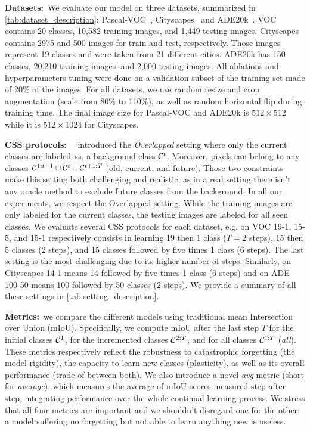 \noindent\textbf{Datasets:\,} We evaluate our model on three datasets, summarized in
\autoref{tab:dataset_description}: Pascal-VOC~\citep{everingham2015pascalvoc},
Cityscapes~\citep{cordts2016cityscapes} and ADE20k~\citep{zhou2017adedataset}. VOC contains 20
classes, 10,582 training images, and 1,449 testing images. Cityscapes contains 2975 and 500 images
for train and test, respectively. Those images represent 19 classes and were taken from 21 different
cities. ADE20k has 150 classes, 20,210 training images, and 2,000 testing images. All ablations and
hyperparameters tuning were done on a validation subset of the training set made of 20\% of the
images. For all datasets, we use random resize and crop augmentation (scale from 80\% to 110\%), as
well as random horizontal flip during training time. The final image size for Pascal-VOC and ADE20k
is $512 \times 512$ while it is $512 \times 1024$ for Cityscapes.

\noindent\textbf{CSS protocols:\,} ~\citep{cermelli2020modelingthebackground} introduced the
\textit{Overlapped} setting where only the current classes are labeled vs. a background class
$\mathcal{C}^t$. Moreover, pixels can belong to any classes $\mathcal{C}^{1:t-1} \cup \mathcal{C}^{t} \cup \mathcal{C}^{t+1:T}$
(old, current, and future). Those two constraints make this setting both challenging and realistic,
as in a real setting there isn't any oracle method to exclude future classes from the background. In
all our experiments, we respect the Overlapped setting. While the training images are only labeled
for the current classes, the testing images are labeled for all seen classes. We evaluate several
CSS protocols for each dataset, e.g. on VOC 19-1, 15-5, and 15-1 respectively consists in learning
19 then 1 class ($T=2$ steps), 15 then 5 classes ($2$ steps), and 15 classes followed by five times
1 class ($6$ steps). The last setting is the most challenging due to its higher number of steps.
Similarly, on Cityscapes 14-1 means 14 followed by five times 1 class ($6$ steps) and on ADE 100-50
means 100 followed by 50 classes ($2$ steps). We provide a summary of all these settings in
\autoref{tab:setting_description}.

\noindent\textbf{Metrics:\,} we compare the different models using traditional mean Intersection
over Union (mIoU). Specifically, we compute mIoU after the last step $T$ for the initial classes
$\mathcal{C}^{1}$, for the incremented classes $\mathcal{C}^{2:T}$, and for all classes $\mathcal{C}^{1:T}$
(\textit{all}). These metrics respectively reflect the robustness to catastrophic forgetting (the
model rigidity), the capacity to learn new classes (plasticity), as well as its overall performance
(trade-of between both). We also introduce a novel \textit{avg} metric (short for \textit{average}),
which measures the average of mIoU scores measured step after step, integrating performance over the
whole continual learning process. We stress that all four metrics are important and we shouldn't
disregard one for the other: a model suffering no forgetting but not able to learn anything new is
useless.

